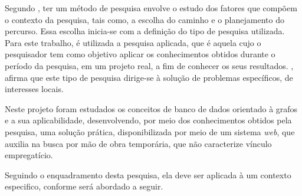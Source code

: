 \par Segundo , ter um método de pesquisa envolve o estudo dos fatores que compõem o contexto da pesquisa, tais como, a escolha do caminho e o planejamento do percurso. Essa escolha inicia-se com a definição do tipo de pesquisa utilizada. Para este trabalho, é utilizada a pesquisa aplicada, que é aquela cujo o pesquisador tem como objetivo aplicar os conhecimentos obtidos durante o período da pesquisa, em um projeto real, a fim de conhecer os seus resultados. , afirma que este tipo de pesquisa dirige-se à solução de problemas específicos, de interesses locais.

\par Neste projeto foram estudados os conceitos de banco de dados orientado à grafos e a sua aplicabilidade, desenvolvendo, por meio dos conhecimentos obtidos pela pesquisa, uma solução prática, disponibilizada por meio de um sistema \textit{web}, que auxilia na busca por mão de obra temporária, que não caracterize vínculo empregatício.

\par Seguindo o enquadramento desta pesquisa, ela deve ser aplicada à um contexto especifico, conforme será abordado a seguir. 




